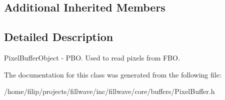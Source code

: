 \subsection*{Additional Inherited Members}


\subsection{Detailed Description}
Pixel\+Buffer\+Object -\/ P\+BO. Used to read pixels from F\+BO. 

The documentation for this class was generated from the following file\+:\begin{DoxyCompactItemize}
\item 
/home/filip/projects/fillwave/inc/fillwave/core/buffers/Pixel\+Buffer.\+h\end{DoxyCompactItemize}
